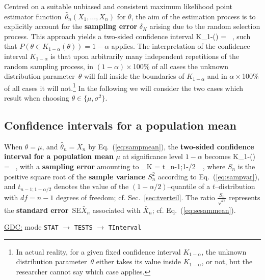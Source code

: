 \medskip
\noindent
Centred on a suitable unbiased and consistent maximum likelihood 
point estimator function~$\hat{\theta}_{n}(X_{1},\ldots,X_{n})$
for $\theta$, the aim of the estimation process is to explicitly
account for the \textbf{sampling error} $\delta_{K}$ arising due to
the random selection process. This approach yields a two-sided
confidence interval
%
\be
K_{1-\alpha}(\theta) =  \ ,
\ee
%
such that $P(\theta \in K_{1-\alpha}(\theta))=1-\alpha$ applies.
The interpretation of the confidence interval $K_{1-\alpha}$ is
that upon arbitrarily many independent repetitions of the
random sampling process, in $(1-\alpha)\times$100\% of all cases
the unknown distribution parameter~$\theta$ will fall inside the
boundaries of $K_{1-\alpha}$ and in $\alpha\times$100\% of all
cases it will not.\footnote{In actual reality, for a given
fixed confidence interval $K_{1-\alpha}$, the unknown distribution
parameter~$\theta$ either takes its value inside $K_{1-\alpha}$, or
not, but the researcher cannot say which case applies.} In the
following we will consider the two cases which result when choosing
$\theta \in \{\mu, \sigma^{2}\}$.

\subsection[Confidence intervals for a mean]{Confidence
intervals for a population mean}
When $\theta=\mu$, and $\hat{\theta}_{n}=\bar{X}_{n}$ by 
Eq.~(\ref{eq:sampmean}), the \textbf{two-sided confidence interval 
for a population mean} $\mu$ at significance level $1-\alpha$ 
becomes
%
\be
K_{1-\alpha}(\mu) =  \ ,
\ee
%
with a \textbf{sampling error} amounting to
%
\be
{}
\delta_{K} = t_{n-1;1-\alpha/2}\, \ ,
\ee
%
where $S_{n}$ is the positive square root of the \textbf{sample 
variance} $S_{n}^{2}$ according to Eq.~(\ref{eq:sampvar}), and
$t_{n-1;1-\alpha/2}$ denotes the value of the 
$(1-\alpha/2)$--quantile of a $t$--distribution with $df=n-1$ 
degrees of freedom; cf. Sec.~\ref{sec:tverteil}. The ratio 
$\displaystyle\frac{S_{n}}{\sqrt{n}}$ represents the
\textbf{standard error}~$\text{SE}\bar{X}_{n}$ associated with
$\bar{X}_{n}$; cf. Eq.~(\ref{eq:sesammean}).

\medskip
\noindent
\underline{GDC:} mode \texttt{STAT} $\rightarrow$ \texttt{TESTS} 
$\rightarrow$ \texttt{TInterval}

